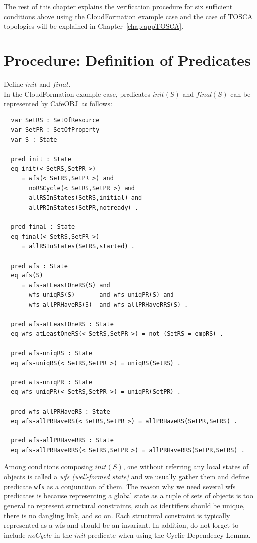 \documentclass[12pt]{report}
\newcommand{\cafeobj}{{\sf CafeOBJ}~}
\begin{document}
The rest of this chapter explains the verification procedure for six
sufficient conditions above using the CloudFormation example case and
the case of TOSCA topologies will be explained in
Chapter~\ref{chap:appTOSCA}.

\section{Procedure: Definition of Predicates}
\label{sec:support}
 Define $init$ and $final$. \\ In the
CloudFormation example case, predicates $init(S)$ and $final(S)$ can
be represented by \cafeobj as follows:
\small
\begin{verbatim}
  var SetRS : SetOfResource
  var SetPR : SetOfProperty
  var S : State

  pred init : State
  eq init(< SetRS,SetPR >)
     = wfs(< SetRS,SetPR >) and
       noRSCycle(< SetRS,SetPR >) and
       allRSInStates(SetRS,initial) and 
       allPRInStates(SetPR,notready) .

  pred final : State
  eq final(< SetRS,SetPR >)
     = allRSInStates(SetRS,started) .

  pred wfs : State
  eq wfs(S)
     = wfs-atLeastOneRS(S) and
       wfs-uniqRS(S)       and wfs-uniqPR(S) and 
       wfs-allPRHaveRS(S)  and wfs-allPRHaveRRS(S) .

  pred wfs-atLeastOneRS : State
  eq wfs-atLeastOneRS(< SetRS,SetPR >) = not (SetRS = empRS) .

  pred wfs-uniqRS : State
  eq wfs-uniqRS(< SetRS,SetPR >) = uniqRS(SetRS) .

  pred wfs-uniqPR : State
  eq wfs-uniqPR(< SetRS,SetPR >) = uniqPR(SetPR) .

  pred wfs-allPRHaveRS : State
  eq wfs-allPRHaveRS(< SetRS,SetPR >) = allPRHaveRS(SetPR,SetRS) .

  pred wfs-allPRHaveRRS : State
  eq wfs-allPRHaveRRS(< SetRS,SetPR >) = allPRHaveRRS(SetPR,SetRS) .
\end{verbatim}
\normalsize
Among conditions composing $init(S)$, one without referring any local
states of objects is called a {\it wfs (well-formed state)} and we
usually gather them and define predicate {\tt wfs} as a conjunction of
them. The reason why we need several wfs predicates
is because representing a global state as a tuple of sets of
objects is too general to represent structural constraints, such as
identifiers should be unique, there is no dangling link, and so on. Each
structural constraint is typically represented as a wfs and should be
an invariant. In addition, do not forget to include $noCycle$
in the $init$ predicate when using the Cyclic
Dependency Lemma.\\
\end{document}
